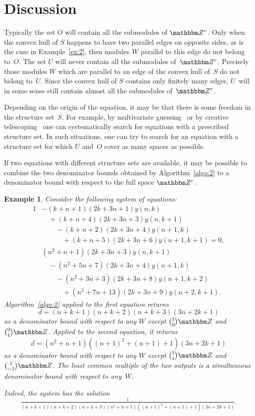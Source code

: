 \documentclass[a4paper]{sig-alternate}
\let\set\mathbbm
\newtheorem{example}{Example}
\begin{document}
\section{Discussion}

Typically the set $O$ will contain all the submodules of $\set Z^r$. Only when
the convex hull of $S$ happens to have two parallel edges on opposite sides, as
is the case in Example~\ref{ex:2}, then modules $W$ parallel to this edge do not
belong to~$O$.  The set $U$ will never contain all the submodules of~$\set
Z^r$. Precisely those modules $W$ which are parallel to an edge of the convex
hull of~$S$ do not belong to~$U$. Since the convex hull of $S$ contains only
finitely many edges, $U$~will in some sense still contain almost all the
submodules of~$\set Z^r$.

Depending on the origin of the equation, it may be that there is some freedom in
the structure set~$S$. For example, by multivariate guessing~\cite{kauers09a} or
by creative telescoping~\cite{zeilberger91,chyzak00,schneider04c} one can
systematically search for equations with a prescribed structure set. In such
situations, one can try to search for an equation with a structure set for which
$U$ and~$O$ cover as many spaces as possible.

If two equations with different structure sets are available, it may be possible
to combine the two denominator bounds obtained by Algorithm~\ref{algo:2} to a
denominator bound with respect to the full space $\set Z^r$.

\begin{example}
  Consider the following system of equations:
  \begin{alignat*}1
    &-(k+n+1) (2 k+3 n+1) y(n,k)\\
    &\quad+(k+n+4) (2 k+3 n+3) y(n,k+1)\\
    &\qquad-(k+n+2) (2 k+3 n+4)y(n+1,k)\\
    &\qquad\quad+(k+n+5) (2 k+3 n+6) y(n+1,k+1) =0 ,\\
    &(n^2+n+1) (2 k+3 n+3) y(n,k+1)\\
    &\quad-(n^2+5 n+7) (2 k+3 n+4)y(n+1,k)\\
    &\qquad-(n^2+3 n+3) (2 k+3 n+8) y(n+1,k+2)\\
    &\qquad\quad+(n^2+7 n+13) (2 k+3 n+9) y(n+2,k+1).
  \end{alignat*}
  Algorithm~\ref{algo:2} applied to the first equation returns
  \[
    d=(n+k+1)(n+k+2)(n+k+3)(3n+2k+1)
  \]
  as a denominator bound with respect to any $W$ except $\binom10\set Z$ and
  $\binom01\set Z$. Applied to the second equation, it returns
  \[
    d=(n^2+n+1)((n+1)^2+(n+1)+1)(3n+2k+1)
  \]
  as a denominator bound with respect to any $W$ except $\binom11\set Z$ and
  $\binom1{-1}\set Z$. The least common multiple of the two outputs is a
  simultaneous denominator bound with respect to any~$W$.

  Indeed, the system has the solution
  \[
    \tfrac1{(n+k+1)(n+k+2)(n+k+3)(n^2+n+1)((n+1)^2+(n+1)+1)(3n+2k+1)}.
  \]
\end{example}
\end{document}
